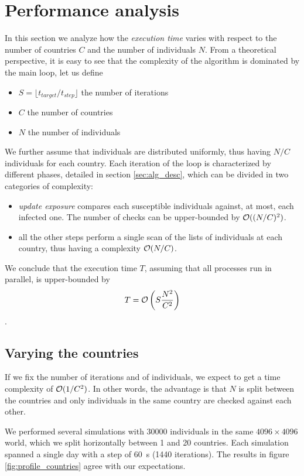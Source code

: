 \section{Performance analysis}
\label{sec:performance_analysis}

In this section we analyze how the \emph{execution time} varies with respect to the number of countries $C$ and the number of individuals $N$.
From a theoretical perspective, it is easy to see that the complexity of the algorithm is dominated by the main loop, let us define
\begin{itemize}
    \item $S = \lfloor t_{target} / t_{step} \rfloor$ the number of iterations
    \item $C$ the number of countries
    \item $N$ the number of individuals
\end{itemize}
We further assume that individuals are distributed uniformly, thus having $N/C$ individuals for each country.
Each iteration of the loop is characterized by different phases, detailed in section \ref{sec:alg_desc}, which can be divided in two categories of complexity:
\begin{itemize}
    \item \emph{update exposure} compares each susceptible individuals against, at most, each infected one. The number of checks can be upper-bounded by $\mathcal{O}((N/C)^2)$.
    \item all the other steps perform a single scan of the lists of individuals at each country, thus having a complexity $\mathcal{O}(N/C)$.
\end{itemize}
We conclude that the execution time $T$, assuming that all processes run in parallel, is upper-bounded by \[T = \mathcal{O} \left(S \frac{N^2}{C^2} \right)\].

\subsection{Varying the countries}
If we fix the number of iterations and of individuals, we expect to get a time complexity of $\mathcal{O}(1/C^2)$. In other words, the advantage is that $N$ is split between the countries and only individuals in the same country are checked against each other.

We performed several simulations with \num{30000} individuals in the same $4096 \times 4096$ world, which we split horizontally between 1 and 20 countries. Each simulation spanned a single day with a step of \SI{60}{s} (1440 iterations). The results in figure \ref{fig:profile_countries} agree with our expectations.

